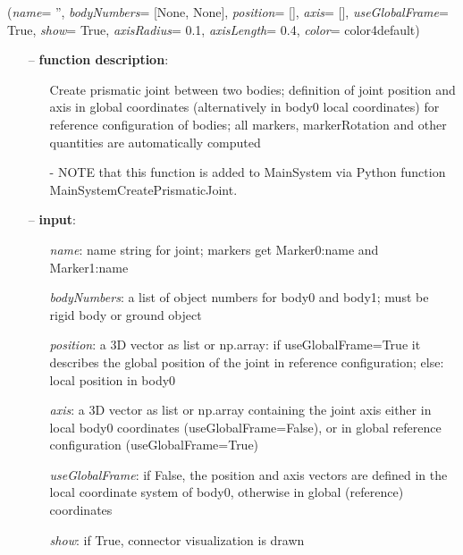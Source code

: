 \ei

%
\begin{flushleft}
\label{sec:mainsystemextensions:CreatePrismaticJoint}
({\it name}= '', {\it bodyNumbers}= [None, None], {\it position}= [], {\it axis}= [], {\it useGlobalFrame}= True, {\it show}= True, {\it axisRadius}= 0.1, {\it axisLength}= 0.4, {\it color}= color4default)
\end{flushleft}
\setlength{\itemindent}{0.7cm}
\begin{itemize}[leftmargin=0.7cm]
\item[--]
{\bf function description}: \vspace{-6pt}
\begin{itemize}[leftmargin=1.2cm]
\setlength{\itemindent}{-0.7cm}
\item[]Create prismatic joint between two bodies; definition of joint position and axis in global coordinates (alternatively in body0 local coordinates) for reference configuration of bodies; all markers, markerRotation and other quantities are automatically computed
\item[]- NOTE that this function is added to MainSystem via Python function MainSystemCreatePrismaticJoint.
\end{itemize}
\item[--]
{\bf input}: \vspace{-6pt}
\begin{itemize}[leftmargin=1.2cm]
\setlength{\itemindent}{-0.7cm}
\item[]{\it name}: name string for joint; markers get Marker0:name and Marker1:name
\item[]{\it bodyNumbers}: a list of object numbers for body0 and body1; must be rigid body or ground object
\item[]{\it position}: a 3D vector as list or np.array: if useGlobalFrame=True it describes the global position of the joint in reference configuration; else: local position in body0
\item[]{\it axis}: a 3D vector as list or np.array containing the joint axis either in local body0 coordinates (useGlobalFrame=False), or in global reference configuration (useGlobalFrame=True)
\item[]{\it useGlobalFrame}: if False, the position and axis vectors are defined in the local coordinate system of body0, otherwise in global (reference) coordinates
\item[]{\it show}: if True, connector visualization is drawn

\end{itemize}
\end{itemize}
